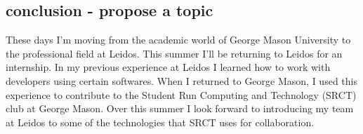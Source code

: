 \documentclass[titlepage]{article}
\begin{document}
\subsection{conclusion - propose a topic}

These days I'm moving from the academic world of George Mason University to the professional field at Leidos. This summer I'll be returning to Leidos for an internship. In my previous experience at Leidos I learned how to work with developers using certain softwares. When I returned to George Mason, I used this experience to contribute to the Student Run Computing and Technology (SRCT) club at George Mason. Over this summer I look forward to introducing my team at Leidos to some of the technologies that SRCT uses for collaboration.








\begin{singlespace}


\newpage
\nocite{*}
\printbibliography
\end{singlespace}
\end{document}
